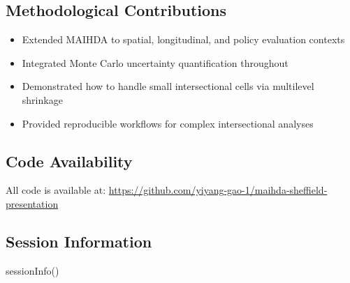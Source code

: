 \documentclass[
]{article}
\newenvironment{Shaded}{\begin{snugshade}}{\end{snugshade}}
\newcommand{\FunctionTok}[1]{\textcolor[rgb]{0.00,0.00,0.00}{#1}}
\newcommand{\NormalTok}[1]{#1}
\providecommand{\tightlist}{%
  \setlength{\itemsep}{0pt}\setlength{\parskip}{0pt}}
\begin{document}
\hypertarget{methodological-contributions}{%
\subsection{Methodological
Contributions}\label{methodological-contributions}}

\begin{itemize}
\tightlist
\item
  Extended MAIHDA to spatial, longitudinal, and policy evaluation
  contexts
\item
  Integrated Monte Carlo uncertainty quantification throughout
\item
  Demonstrated how to handle small intersectional cells via multilevel
  shrinkage
\item
  Provided reproducible workflows for complex intersectional analyses
\end{itemize}

\hypertarget{code-availability}{%
\subsection{Code Availability}\label{code-availability}}

All code is available at:
\url{https://github.com/yiyang-gao-1/maihda-sheffield-presentation}

\hypertarget{session-information}{%
\subsection{Session Information}\label{session-information}}

\begin{Shaded}
\begin{Highlighting}[]
\FunctionTok{sessionInfo}\NormalTok{()}
\end{Highlighting}
\end{Shaded}
\end{document}
